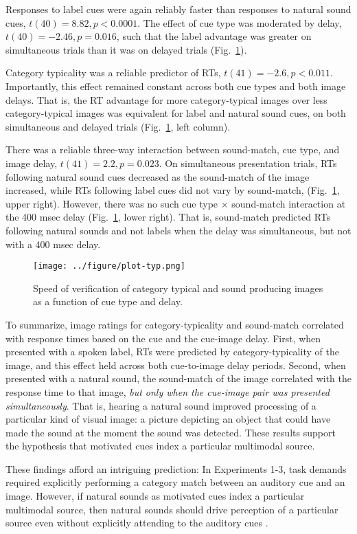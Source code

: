 \documentclass[12pt, titlepage]{article}
\begin{document}
Responses to label cues were again reliably faster than responses to natural sound cues, $t(40)=8.82, p<0.0001$. The effect of cue type was moderated by delay, $t(40)=-2.46, p=0.016$, such that the label advantage was greater on simultaneous trials than it was on delayed trials (Fig.~\ref{fig:typ}).

Category typicality was a reliable predictor of RTs, $t(41)=-2.6, p<0.011$. Importantly, this effect remained constant across both cue types and both image delays. That is, the RT advantage for more category-typical images over less category-typical images was equivalent for label and natural sound cues, on both simultaneous and delayed trials (Fig.~\ref{fig:typ}, left column).

There was a reliable three-way interaction between sound-match, cue type, and image delay, $t(41)=2.2, p=0.023$. On simultaneous presentation trials, RTs following natural sound cues decreased as the sound-match of the image increased, while RTs following label cues did not vary by sound-match, (Fig.~\ref{fig:typ}, upper right). However, there was no such cue type $\times$ sound-match interaction at the 400 msec delay (Fig.~\ref{fig:typ}, lower right). That is, sound-match predicted RTs following natural sounds and not labels when the delay was simultaneous, but not with a 400 msec delay.

\begin{figure}[h!]
	\centering
	\caption{Speed of verification of category typical and sound producing images as a function of cue type and delay.}
	\label{fig:typ}
	\texttt{[image: ../figure/plot-typ.png]}
\end{figure}

To summarize, image ratings for category-typicality and sound-match correlated with response times based on the cue and the cue-image delay. First, when presented with a spoken label, RTs were predicted by category-typicality of the image, and this effect held across both cue-to-image delay periods. Second, when presented with a natural sound, the sound-match of the image correlated with the response time to that image, \textit{but only when the cue-image pair was presented simultaneously}. That is, hearing a natural sound improved processing of a particular kind of visual image: a picture depicting an object that could have made the sound at the moment the sound was detected. These results support the hypothesis that motivated cues index a particular multimodal source.

These findings afford an intriguing prediction: In Experiments 1-3, task demands required explicitly performing a category match between an auditory cue and an image. However, if natural sounds as motivated cues index a particular multimodal source, then natural sounds should drive perception of a particular source even without explicitly attending to the auditory cues \cite{Orgs:2008dk}.
\end{document}
